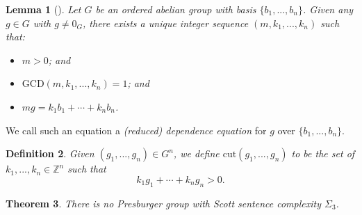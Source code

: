 \documentclass{amsart}%
\newtheorem{theorem}{Theorem}
\numberwithin{theorem}{section}
\newtheorem{definition}[theorem]{Definition}
\newtheorem{lemma}[theorem]{Lemma}
\newcommand{\Z}{\mathbb{Z}}
\newcommand{\0}{\emptyset}
\newcommand{\cut}{\text{cut}}
\begin{document}
\begin{lemma}[\cite{Reed-et-al}]
\label{dependence equation}
    Let $G$ be an ordered abelian group with basis $\{b_1,...,b_n\}$. Given any $g\in G$ with $g\neq 0_G$, there exists a unique integer sequence $(m,k_1,...,k_n)$ such that:
    \begin{itemize}
        \item $m>0$; and
        \item $\text{GCD}(m,k_1,...,k_n)=1$; and
        \item $mg=k_1 b_1+ \cdots +k_nb_n$.
    \end{itemize}
\end{lemma}
We call such an equation a \emph{(reduced) dependence equation} for $g$ over $\{b_1,...,b_n\}$.

\begin{definition}
    Given $(g_1,...,g_n)\in G^n$, we define $\cut(g_1,...,g_n)$ to be the set of $k_1,...,k_n\in \Z^n$ such that $$k_1g_1+\cdots + k_ng_n >0. $$
\end{definition}

\begin{theorem}
\label{thm: no sigma3}
    There is no Presburger group with Scott sentence complexity $\Sigma_3$.
\end{theorem}
\end{document}

